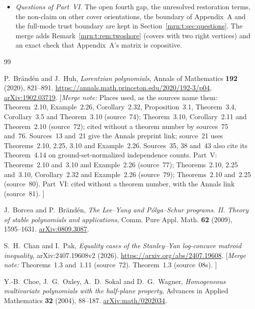 \documentclass[11pt,a4paper]{article}
\theoremstyle{remark}\newtheorem{remark}[theorem]{Remark}
\newcommand{\mnote}[1]{[\textit{Merge note:} #1]}
\begin{document}
\begin{itemize}
  displays became a pointer note and its conclusions are kept.
  Theorem~\ref{mrn:t:tn:thm:quadratic} is printed in full with a note, since
  it generalizes source~80's theorem rather than repeating it.
\item \emph{Questions of Part~VI.} The open fourth gap, the unresolved
  restoration terms, the non-claim on other cover orientations, the boundary
  of Appendix~A and the full-mode trust boundary are kept in
  Section~\ref{mrn:t:sec:questions}. The merge adds
  Remark~\ref{mrn:t:rem:twoshore} (covers with two right vertices) and an
  exact check that Appendix~A's matrix is copositive.
\end{itemize}

\begin{thebibliography}{99}
\small
\setlength{\itemsep}{2pt}

P.~Br\"and\'en and J.~Huh, \emph{Lorentzian polynomials}, Annals of
Mathematics \textbf{192} (2020), 821--891.
\url{https://annals.math.princeton.edu/2020/192-3/p04},
\href{https://arxiv.org/abs/1902.03719}{arXiv:1902.03719}.
\mnote{Places used, as the sources name them: Theorem~2.10, Example~2.26,
Corollary~2.32, Proposition~3.1, Theorem~3.4, Corollary~3.5 and
Theorem~3.10 (source~74); Theorem~3.10, Corollary~2.11 and Theorem~2.10
(source~72); cited without a theorem number by sources~75 and~76.
Sources~13 and~21 give the Annals preprint link; source~21 uses Theorems~2.10, 2.25, 3.10 and Example~2.26.
Sources~35, 38 and~43 also cite its Theorem~4.14 on ground-set-normalized independence counts.
Part~V: Theorems~2.10 and~3.10 and Example~2.26 (source~77); Theorems~2.10,
2.25 and~3.10, Corollary~2.32 and Example~2.26 (source~79); Theorems~2.10
and~2.25 (source~80).
Part~VI: cited without a theorem number, with the Annals link (source~81).
}

J.~Borcea and P.~Br\"and\'en, \emph{The Lee--Yang and P\'olya--Schur
programs. II. Theory of stable polynomials and applications}, Comm. Pure
Appl. Math. \textbf{62} (2009), 1595--1631.
\href{https://arxiv.org/abs/0809.3087}{arXiv:0809.3087}.

S.~H.~Chan and I.~Pak, \emph{Equality cases of the Stanley--Yan log-concave
matroid inequality}, arXiv:2407.19608v2 (2026).
\url{https://arxiv.org/abs/2407.19608}.
\mnote{Theorems~1.3 and~1.11 (source~72).
Theorem~1.3 (source~08s).
}

Y.-B.~Choe, J.~G.~Oxley, A.~D.~Sokal and D.~G.~Wagner, \emph{Homogeneous
multivariate polynomials with the half-plane property}, Advances in Applied
Mathematics \textbf{32} (2004), 88--187.
\href{https://arxiv.org/abs/math/0202034}{arXiv:math/0202034}.


\end{thebibliography}
\end{document}
